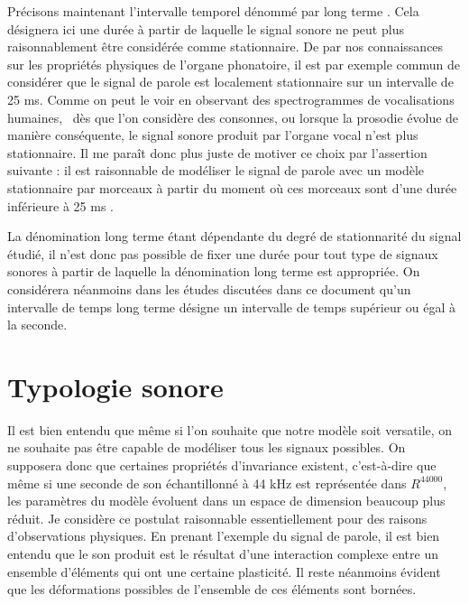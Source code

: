 Précisons maintenant l'intervalle temporel dénommé par \og long terme \fg. Cela désignera ici une durée à partir de laquelle le signal sonore ne peut plus raisonnablement être considérée comme stationnaire. De par nos connaissances sur les propriétés physiques de l'organe phonatoire, il est par exemple commun de considérer que le signal de parole est localement stationnaire sur un intervalle de 25 ms. Comme on peut le voir en observant des spectrogrammes de vocalisations humaines,~\cite{ladefoged2014course} dès que l'on considère des consonnes, ou lorsque la prosodie évolue de manière conséquente, le signal sonore produit par l'organe vocal n'est plus stationnaire. Il me paraît donc plus juste de motiver ce choix par l'assertion suivante : \og il est raisonnable de modéliser le signal de parole avec un modèle stationnaire par morceaux à partir du moment où ces morceaux sont d'une durée inférieure à 25 ms \fg.


La dénomination \og long terme \fg  étant dépendante du degré de stationnarité du signal étudié, il n'est donc pas possible de fixer une durée pour tout type de signaux sonores à partir de laquelle la dénomination \og long terme \fg est appropriée. On considérera néanmoins dans les études discutées dans ce document qu'un intervalle de temps  \og long terme \fg désigne un intervalle de temps supérieur ou égal à la seconde.

\section{ \nmu Typologie sonore} \label{sec:typologie}

Il est bien entendu que même si l'on souhaite que notre modèle soit versatile, on ne souhaite pas être capable de modéliser tous les signaux possibles. On supposera donc que certaines propriétés d'invariance existent, c'est-à-dire que même si une seconde de son échantillonné à 44 kHz est représentée dans $R^{44000}$, les paramètres du modèle évoluent dans un espace de dimension beaucoup plus réduit. Je considère ce postulat raisonnable essentiellement pour des raisons d'observations physiques. En prenant l'exemple du signal de parole, il est bien entendu que le son produit est le résultat d'une interaction complexe entre un ensemble d'éléments qui ont une certaine plasticité. Il reste néanmoins évident que les déformations possibles de l'ensemble de ces éléments sont bornées.

